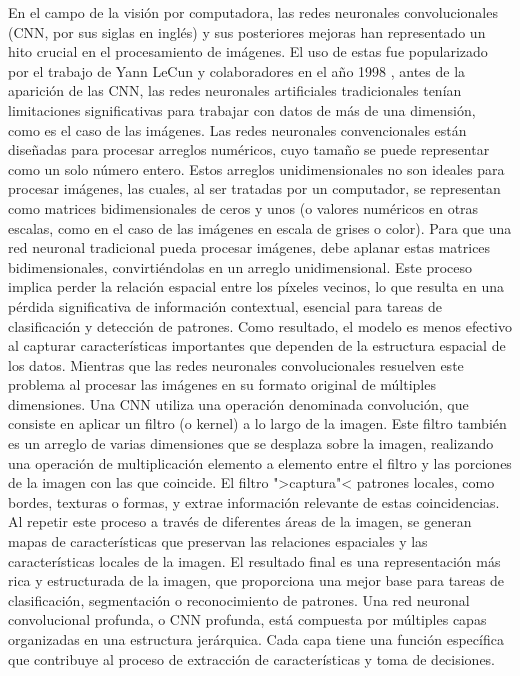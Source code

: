 En el campo de la visión por computadora, las redes neuronales convolucionales (CNN, por
sus siglas en inglés) y sus posteriores mejoras han representado un hito crucial en el
procesamiento de imágenes. El uso de estas fue popularizado por el trabajo de Yann LeCun y
colaboradores en el año 1998 , antes de la aparición de las
CNN, las redes neuronales artificiales tradicionales tenían limitaciones significativas
para trabajar con datos de más de una dimensión, como es el caso de las imágenes. Las
redes neuronales convencionales están diseñadas para procesar arreglos numéricos, cuyo
tamaño se puede representar como un solo número entero. Estos arreglos unidimensionales no
son ideales para procesar imágenes, las cuales, al ser tratadas por un computador, se
representan como matrices bidimensionales de ceros y unos (o valores numéricos en otras
escalas, como en el caso de las imágenes en escala de grises o color).
Para que una red neuronal tradicional pueda procesar imágenes, debe aplanar estas matrices
bidimensionales, convirtiéndolas en un arreglo unidimensional. Este proceso implica perder
la relación espacial entre los píxeles vecinos, lo que resulta en una pérdida
significativa de información contextual, esencial para tareas de clasificación y detección
de patrones. Como resultado, el modelo es menos efectivo al capturar características
importantes que dependen de la estructura espacial de los datos.
Mientras que las redes neuronales convolucionales resuelven este problema al procesar las
imágenes en su formato original de múltiples dimensiones. Una CNN utiliza una operación
denominada convolución, que consiste en aplicar un filtro (o kernel) a lo largo de la
imagen. Este filtro también es un arreglo de varias dimensiones que se desplaza sobre la
imagen, realizando una operación de multiplicación elemento a elemento entre el filtro y
las porciones de la imagen con las que coincide. El filtro ">captura"< patrones locales,
como bordes, texturas o formas, y extrae información relevante de estas coincidencias. Al
repetir este proceso a través de diferentes áreas de la imagen, se generan mapas de
características que preservan las relaciones espaciales y las características locales de
la imagen. El resultado final es una representación más rica y estructurada de la imagen,
que proporciona una mejor base para tareas de clasificación, segmentación o reconocimiento
de patrones. Una red neuronal convolucional profunda, o CNN profunda, está compuesta por
múltiples capas organizadas en una estructura jerárquica. Cada capa tiene una función
específica que contribuye al proceso de extracción de características y toma de
decisiones.

